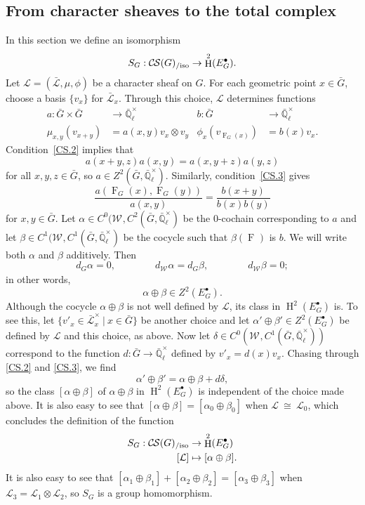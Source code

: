 \documentclass[10pt]{amsart}
\theoremstyle{plain}
\theoremstyle{definition}
\theoremstyle{remark}
\newcommand{\EE}{\mathbb{\bar Q}_\ell}
\newcommand{\EEx}{\EE^\times}
\newcommand{\Weil}[1]{\mathcal{W}_{#1}}
\newcommand{\Frob}[1]{\operatorname{F}_{#1}}
\DeclareMathOperator{\Hh}{H}
\newcommand{\tq}{{\ \vert\ }}
\newcommand{\iso}{{\ \cong\ }}
\newcommand{\cs}[1]{{\mathcal{#1}}}
\newcommand{\gcs}[1]{{\mathcal{\bar #1}}}
\newcommand{\CS}{{\mathcal{C\hskip-0.8pt S}}}
\newcommand{\CSiso}[1]{\CS(#1)_{/\text{iso}}}
\begin{document}
\subsection{From character sheaves to the total complex}\label{ssec:S}

In this section we define an isomorphism
\[
S_G : \CSiso{G} \to \Hh^2(E^\bullet_G).
\]
Let $\cs{L} = (\gcs{L},\mu,\phi)$ be a character sheaf on $G$.
For each geometric point $x\in {\bar G}$, choose a basis $\{ v_x \}$ for $\gcs{L}_x$.
Through this choice, $\cs{L}$ determines functions
\begin{align*}
a : {\bar G}\times {\bar G} &\to \EEx & b : {\bar G} &\to \EEx \\
\mu_{x,y}(v_{x+y}) &= a(x,y) v_x \otimes v_y & \phi_x(v_{\Frob{G}(x)}) &= b(x) v_x.
\end{align*}
Condition~\ref{CS.2} implies that
\begin{equation}\label{2-cocyle}
a(x+y,z) a(x,y) = a(x,y+z) a(y,z)
\end{equation}
for all $x,y,z\in {\bar G}$, so $a \in Z^2({\bar G},\EEx)$.  Similarly, condition~\ref{CS.3} gives
\begin{equation}\label{nohom}
\frac{a(\Frob{G}(x),\Frob{G}(y))}{a(x,y)} =  \frac{b(x+y)}{b(x) b(y)}
\end{equation}
for $x, y \in {\bar G}$.
Let $\alpha \in C^0(\Weil{},C^2({\bar G},\EEx)$ be the $0$-cochain corresponding to $a$ and let $\beta\in C^1(\Weil{},C^1({\bar G},\EEx)$ be the cocycle such that $\beta(\Frob{})$ is $b$.  We will write both $\alpha$ and $\beta$ additively.
Then
\[
d_G\alpha =0, \qquad\qquad
d_{\Weil{}} \alpha = d_{G} \beta,\qquad\qquad
d_{\Weil{}} \beta =0;
\]
in other words,
\[\alpha\oplus \beta \in Z^2(E^\bullet_G).\]
Although the cocycle $\alpha\oplus \beta$ is not well defined by $\cs{L}$, its class in $\Hh^2(E^\bullet_G)$ is.
To see this, let $\{ v'_x \in \gcs{L}_x^\times \tq x \in {\bar G}\}$ be another choice and let $\alpha'\oplus \beta' \in Z^2(E^\bullet_G)$ be defined by $\cs{L}$ and this choice, as above.
Now let $\delta \in C^0(\Weil{},C^1({\bar G},\EEx))$ correspond to the function $d : {\bar G}\to \EEx$ defined by $v'_x = d(x) v_x$.
Chasing through \ref{CS.2} and \ref{CS.3}, we find
\[
\alpha'\oplus\beta' = \alpha\oplus\beta + d\delta,
\]
so the class $[\alpha\oplus\beta]$ of $\alpha\oplus\beta$ in $\Hh^2(E^\bullet_G)$ is independent of the choice made above. It is also easy to see that $[\alpha\oplus\beta] = [\alpha_0\oplus\beta_0]$ when $\cs{L} \iso \cs{L}_0$,
which concludes the definition of the function
\begin{align*}
S_G : \CSiso{G} &\to \Hh^2(E^\bullet_G)\\
[\cs{L}] &\mapsto [\alpha\oplus \beta].
\end{align*}
It is also easy to see that $[\alpha_1\oplus\beta_1] + [\alpha_2\oplus\beta_2] = [\alpha_3\oplus\beta_3]$ when $\cs{L}_3 = \cs{L}_1\otimes \cs{L}_2$, so $S_G$ is a group homomorphism.
\end{document}
